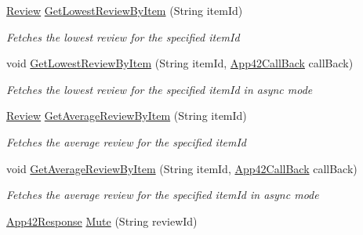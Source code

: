 \begin{DoxyCompactItemize}
\item 
\hyperlink{classcom_1_1shephertz_1_1app42_1_1paas_1_1sdk_1_1csharp_1_1review_1_1_review}{Review} \hyperlink{classcom_1_1shephertz_1_1app42_1_1paas_1_1sdk_1_1csharp_1_1review_1_1_review_service_aa19716aa84371714b15f4be711af8131}{Get\+Lowest\+Review\+By\+Item} (String item\+Id)
\begin{DoxyCompactList}\small\item\em Fetches the lowest review for the specified item\+Id \end{DoxyCompactList}\item 
void \hyperlink{classcom_1_1shephertz_1_1app42_1_1paas_1_1sdk_1_1csharp_1_1review_1_1_review_service_acadcc249db1bf1ba028fd0afaa2f522b}{Get\+Lowest\+Review\+By\+Item} (String item\+Id, \hyperlink{interfacecom_1_1shephertz_1_1app42_1_1paas_1_1sdk_1_1csharp_1_1_app42_call_back}{App42\+Call\+Back} call\+Back)
\begin{DoxyCompactList}\small\item\em Fetches the lowest review for the specified item\+Id in async mode \end{DoxyCompactList}\item 
\hyperlink{classcom_1_1shephertz_1_1app42_1_1paas_1_1sdk_1_1csharp_1_1review_1_1_review}{Review} \hyperlink{classcom_1_1shephertz_1_1app42_1_1paas_1_1sdk_1_1csharp_1_1review_1_1_review_service_abd7c2113e381ee2f487525a582299629}{Get\+Average\+Review\+By\+Item} (String item\+Id)
\begin{DoxyCompactList}\small\item\em Fetches the average review for the specified item\+Id \end{DoxyCompactList}\item 
void \hyperlink{classcom_1_1shephertz_1_1app42_1_1paas_1_1sdk_1_1csharp_1_1review_1_1_review_service_a191e4439aa804d1c55d4e16ba3ebb435}{Get\+Average\+Review\+By\+Item} (String item\+Id, \hyperlink{interfacecom_1_1shephertz_1_1app42_1_1paas_1_1sdk_1_1csharp_1_1_app42_call_back}{App42\+Call\+Back} call\+Back)
\begin{DoxyCompactList}\small\item\em Fetches the average review for the specified item\+Id in async mode \end{DoxyCompactList}\item 
\hyperlink{classcom_1_1shephertz_1_1app42_1_1paas_1_1sdk_1_1csharp_1_1_app42_response}{App42\+Response} \hyperlink{classcom_1_1shephertz_1_1app42_1_1paas_1_1sdk_1_1csharp_1_1review_1_1_review_service_a53f361b067cfa0e41694c25b96c4d4f2}{Mute} (String review\+Id)

\end{DoxyCompactItemize}
